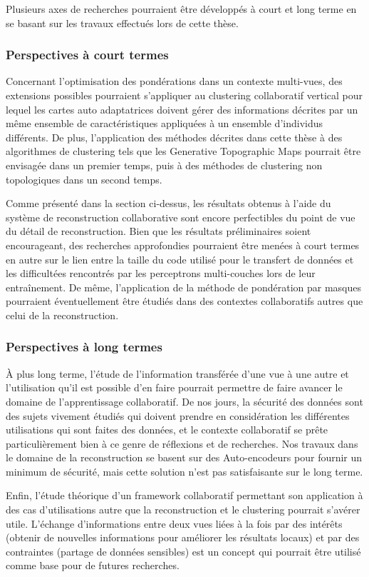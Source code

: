 \documentclass[a4paper]{article}
\begin{document}
Plusieurs axes de recherches pourraient \^{e}tre développés à court et long terme en se basant sur les travaux effectués lors de cette thèse. 

\subsubsection{Perspectives à court termes}

Concernant l'optimisation des pondérations dans un contexte multi-vues, des extensions possibles pourraient s'appliquer au clustering collaboratif vertical pour lequel les cartes auto adaptatrices doivent gérer des informations décrites par un m\^{e}me ensemble de caractéristiques appliquées à un ensemble d'individus différents. De plus, l'application des méthodes décrites dans cette thèse à des algorithmes de clustering tels que les Generative Topographic Maps pourrait \^{e}tre envisagée dans un premier temps, puis à des méthodes de clustering non topologiques dans un second temps.

Comme présenté dans la section ci-dessus, les résultats obtenus à l'aide du système de reconstruction collaborative sont encore perfectibles du point de vue du détail de reconstruction. Bien que les résultats préliminaires soient encourageant, des recherches approfondies pourraient \^{e}tre menées à court termes en autre sur le lien entre la taille du code utilisé pour le transfert de données et les difficultées rencontrés par les perceptrons multi-couches lors de leur entraînement. De m\^{e}me, l'application de la méthode de pondération par masques pourraient éventuellement \^{e}tre étudiés dans des contextes collaboratifs autres que celui de la reconstruction.

\subsubsection{Perspectives à long termes}
À plus long terme, l'étude de l'information transférée d'une vue à une autre et l'utilisation qu'il est possible d'en faire pourrait permettre de faire avancer le domaine de l'apprentissage collaboratif. De nos jours, la sécurité des données sont des sujets vivement étudiés qui doivent prendre en considération les différentes utilisations qui sont faites des données, et le contexte collaboratif se pr\^{e}te particulièrement bien à ce genre de réflexions et de recherches. Nos travaux dans le domaine de la reconstruction se basent sur des Auto-encodeurs pour fournir un minimum de sécurité, mais cette solution n'est pas satisfaisante sur le long terme.

Enfin, l'étude théorique d'un framework collaboratif permettant son application à des cas d'utilisations autre que la reconstruction et le clustering pourrait s'avérer utile. L'échange d'informations entre deux vues liées à la fois par des intér\^{e}ts (obtenir de nouvelles informations pour améliorer les résultats locaux) et par des contraintes (partage de données sensibles) est un concept qui pourrait \^{e}tre utilisé comme base pour de futures recherches.


    
    
\end{document}
